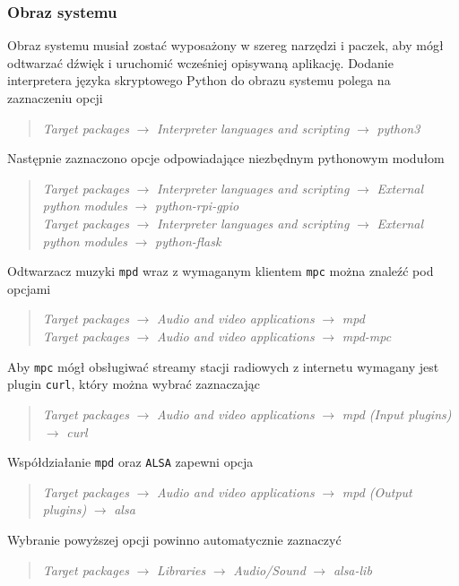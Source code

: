 \documentclass[10pt,a4paper]{article}
\begin{document}
\subsubsection{Obraz systemu}
Obraz systemu musiał zostać wyposażony w szereg narzędzi i paczek, aby mógł odtwarzać dźwięk i uruchomić wcześniej opisywaną aplikację. Dodanie interpretera języka skryptowego Python do obrazu systemu polega na zaznaczeniu opcji
\begin{quote}
\textit{Target packages} $\rightarrow$ \textit{Interpreter languages and scripting} $\rightarrow$ \textit{python3}
\end{quote}
Następnie zaznaczono opcje odpowiadające niezbędnym pythonowym modułom
\begin{quote}
\textit{Target packages} $\rightarrow$ \textit{Interpreter languages and scripting} $\rightarrow$ \textit{External python modules} $\rightarrow$ \textit{python-rpi-gpio}\\
\textit{Target packages} $\rightarrow$ \textit{Interpreter languages and scripting} $\rightarrow$ \textit{External python modules} $\rightarrow$ \textit{python-flask}
\end{quote}
Odtwarzacz muzyki \texttt{mpd} wraz z wymaganym klientem \texttt{mpc} można znaleźć pod opcjami
\begin{quote}
\textit{Target packages} $\rightarrow$ \textit{Audio and video applications} $\rightarrow$ \textit{mpd}\\
\textit{Target packages} $\rightarrow$ \textit{Audio and video applications} $\rightarrow$ \textit{mpd-mpc}
\end{quote}
Aby \texttt{mpc} mógł obsługiwać streamy stacji radiowych z internetu wymagany jest plugin \texttt{curl}, który można wybrać zaznaczając
\begin{quote}
\textit{Target packages} $\rightarrow$ \textit{Audio and video applications} $\rightarrow$ \textit{mpd (Input plugins)} $\rightarrow$ \textit{curl}
\end{quote}
Współdziałanie \texttt{mpd} oraz \texttt{ALSA} zapewni opcja
\begin{quote}
\textit{Target packages} $\rightarrow$ \textit{Audio and video applications} $\rightarrow$ \textit{mpd (Output plugins)} $\rightarrow$ \textit{alsa}
\end{quote}
Wybranie powyższej opcji powinno automatycznie zaznaczyć
\begin{quote}
\textit{Target packages} $\rightarrow$ \textit{Libraries} $\rightarrow$ \textit{Audio/Sound} $\rightarrow$ \textit{alsa-lib}
\end{quote}
\end{document}
